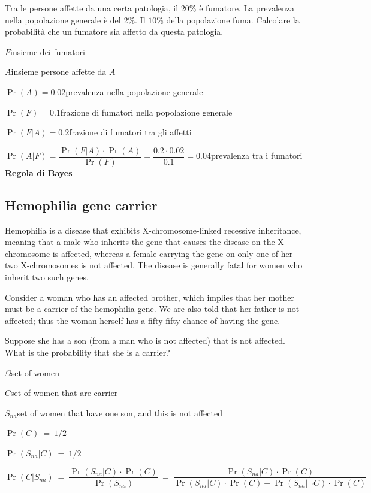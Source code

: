 \documentclass[11pt,openany]{book}
\begin{document}
Tra le persone affette da una certa patologia, il $20\%$ è fumatore. La prevalenza nella popolazione generale è del $2\%$. Il $10\%$ della popolazione fuma. Calcolare la probabilità che un fumatore sia affetto da questa patologia.


$F$\hfill insieme dei fumatori

$A$\hfill insieme persone affette da $A$

$\Pr(A)=0.02$\hfill prevalenza nella popolazione generale

$\Pr(F)=0.1$\hfill frazione di fumatori nella popolazione generale

$\Pr(F|A)=0.2$\hfill frazione di fumatori tra gli affetti

$\Pr(A|F)=\dfrac{\Pr(F|A)\cdot \Pr(A)}{\Pr(F)}=\dfrac{0.2\cdot0.02}{0.1}=0.04$\hfill prevalenza tra i fumatori
\hfill{}\clearpage\hfill
\hfill\textbf{{\color{brown}\hyperref[RegolaBayes]{Regola di Bayes} \faShare}}
\subsection{Hemophilia gene carrier }
\label{Hemophilia}

Hemophilia is a disease that exhibits X-chromosome-linked recessive inheritance, meaning that a male who inherits the gene that causes the disease on the X-chromosome is affected, whereas a
female carrying the gene on only one of her two X-chromosomes is not affected. The disease is generally fatal for women who inherit two such genes.

Consider a woman who has an affected brother, which implies that her mother must be a carrier of the hemophilia gene. We are also told that her father is not affected; thus the woman herself has a fifty-fifty chance of having the gene.

Suppose she has a son (from a man who is not affected) that is not affected. What is the probability that she is a carrier?

$\Omega$\hfill  set of women 

$C$\hfill set of women that are carrier

$S_{na}$\hfill set of women that have one son, and this is not affected

$\Pr(C)\ =\ 1/2$\hfill 

$\Pr(S_{na}|C)\ =\ 1/2$\hfill 

$\Pr(C|S_{na})\ =\ \dfrac{\Pr(S_{na}|C)\cdot \Pr(C)}{\Pr(S_{na})}\ =\ \dfrac{\Pr(S_{na}|C)\cdot \Pr(C)}{\Pr(S_{na}|C)\cdot \Pr(C)+\Pr(S_{na}|\neg C)\cdot \Pr(C)}$
\end{document}
